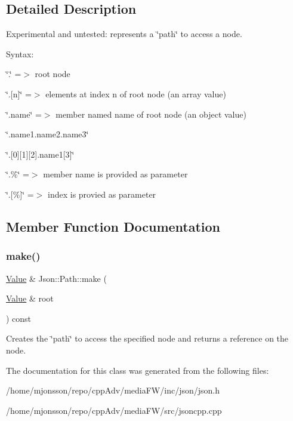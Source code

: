 \subsection{Detailed Description}
Experimental and untested\+: represents a \char`\"{}path\char`\"{} to access a node. 

Syntax\+:
\begin{DoxyItemize}
\item \char`\"{}.\char`\"{} =$>$ root node
\item \char`\"{}.\mbox{[}n\mbox{]}\char`\"{} =$>$ elements at index \textquotesingle{}n\textquotesingle{} of root node (an array value)
\item \char`\"{}.\+name\char`\"{} =$>$ member named \textquotesingle{}name\textquotesingle{} of root node (an object value)
\item \char`\"{}.\+name1.\+name2.\+name3\char`\"{}
\item \char`\"{}.\mbox{[}0\mbox{]}\mbox{[}1\mbox{]}\mbox{[}2\mbox{]}.\+name1\mbox{[}3\mbox{]}\char`\"{}
\item \char`\"{}.\%\char`\"{} =$>$ member name is provided as parameter
\item \char`\"{}.\mbox{[}\%\mbox{]}\char`\"{} =$>$ index is provied as parameter 
\end{DoxyItemize}

\subsection{Member Function Documentation}
\mbox{\label{classJson_1_1Path_a858f9426f0f7bbe0450644d72b44e26b}} 
\subsubsection{\texorpdfstring{make()}{make()}}
{\footnotesize\ttfamily \hyperlink{classJson_1_1Value}{Value} \& Json\+::\+Path\+::make (\begin{DoxyParamCaption}\item[{\hyperlink{classJson_1_1Value}{Value} \&}]{root }\end{DoxyParamCaption}) const}

Creates the \char`\"{}path\char`\"{} to access the specified node and returns a reference on the node. 

The documentation for this class was generated from the following files\+:\begin{DoxyCompactItemize}
\item 
/home/mjonsson/repo/cpp\+Adv/media\+F\+W/inc/json/json.\+h\item 
/home/mjonsson/repo/cpp\+Adv/media\+F\+W/src/jsoncpp.\+cpp\end{DoxyCompactItemize}
